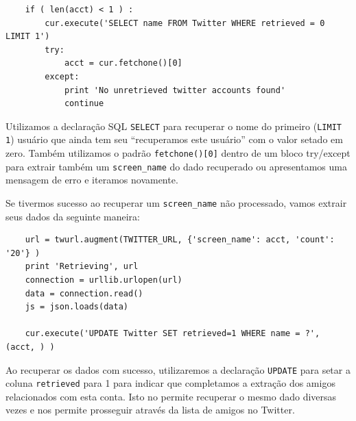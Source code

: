 \beforeverb
\begin{verbatim}
    if ( len(acct) < 1 ) :
        cur.execute('SELECT name FROM Twitter WHERE retrieved = 0 LIMIT 1')
        try:
            acct = cur.fetchone()[0]
        except:
            print 'No unretrieved twitter accounts found'
            continue
\end{verbatim}
\afterverb
%

%
Utilizamos a declaração SQL {\tt SELECT} para recuperar o nome do primeiro
({\tt LIMIT 1}) usuário que ainda tem seu ``recuperamos este usuário'' com o
valor setado em zero. Também utilizamos o padrão {\tt fetchone()[0]} dentro de
um bloco try/except para extrair também um \verb"screen_name" do dado
recuperado ou apresentamos uma mensagem de erro e iteramos novamente.


Se tivermos sucesso ao recuperar um \verb"screen_name" não processado, vamos
extrair seus dados da seguinte maneira:

\beforeverb
\begin{verbatim}
    url = twurl.augment(TWITTER_URL, {'screen_name': acct, 'count': '20'} )
    print 'Retrieving', url
    connection = urllib.urlopen(url)
    data = connection.read()
    js = json.loads(data)

    cur.execute('UPDATE Twitter SET retrieved=1 WHERE name = ?', (acct, ) )
\end{verbatim}
\afterverb
%
%
Ao recuperar os dados com sucesso, utilizaremos a declaração {\tt UPDATE} para
setar a coluna {\tt retrieved} para 1 para indicar que completamos a extração
dos amigos relacionados com esta conta. Isto no permite recuperar o mesmo dado
diversas vezes e nos permite prosseguir através da lista de amigos no Twitter. 

